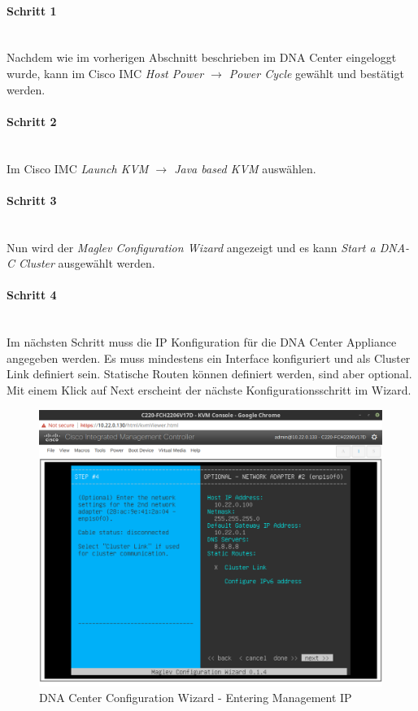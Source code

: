 \paragraph{Schritt 1}
~\\
Nachdem wie im vorherigen Abschnitt beschrieben im DNA Center eingeloggt wurde, kann im Cisco IMC \textit{Host Power $\rightarrow$ Power Cycle} gewählt und bestätigt werden.

\paragraph{Schritt 2}
~\\
Im Cisco IMC \textit{Launch KVM $\rightarrow$ Java based KVM} auswählen.

\paragraph{Schritt 3}
~\\
Nun wird der \textit{Maglev Configuration Wizard} angezeigt und es kann \textit{Start a DNA-C Cluster} ausgewählt werden.

\paragraph{Schritt 4}
~\\
Im nächsten Schritt muss die IP Konfiguration für die DNA Center Appliance angegeben werden. Es muss mindestens ein Interface konfiguriert und als Cluster Link definiert sein. Statische Routen können definiert werden, sind aber optional. Mit einem Klick auf Next erscheint der nächste Konfigurationsschritt im Wizard.

\begin{figure}[H]
	\centering
	\includegraphics[height=9cm]{img/sc_002.png}
	\caption{DNA Center Configuration Wizard - Entering Management IP}
	\label{fig:installguide-dna-center-install-step-4}
\end{figure} 

